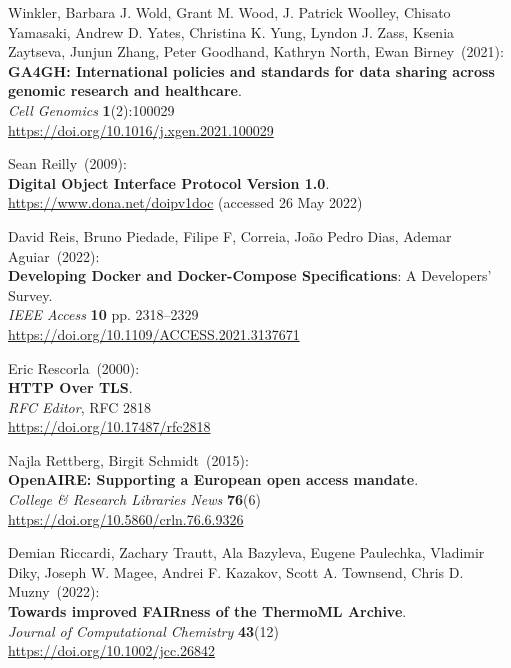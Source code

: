 \begin{thebibliography}{9}
Winkler, Barbara J. Wold, Grant M. Wood, J. Patrick Woolley, Chisato Yamasaki, Andrew D. Yates, Christina K. Yung, Lyndon J. Zass, Ksenia Zaytseva, Junjun Zhang, Peter Goodhand, Kathryn North, Ewan Birney~(2021): \\
\textbf{GA4GH: International policies and standards for data sharing across genomic research and healthcare}.\\
\emph{Cell Genomics} \textbf{1}(2):100029\\
\url{https://doi.org/10.1016/j.xgen.2021.100029}

Sean Reilly~(2009): \\
\textbf{Digital Object Interface Protocol Version 1.0}.\\
\url{https://www.dona.net/doipv1doc} (accessed 26 May 2022)

David Reis, Bruno Piedade, Filipe F, Correia, João Pedro Dias, Ademar Aguiar~(2022): \\
\textbf{Developing Docker and Docker-Compose Specifications}: A Developers’ Survey.\\
\emph{IEEE Access} \textbf{10} pp. 2318--2329 \\
\url{https://doi.org/10.1109/ACCESS.2021.3137671}

Eric Rescorla~(2000): \\
\textbf{HTTP Over TLS}.\\
\emph{RFC Editor}, RFC 2818\\
\url{https://doi.org/10.17487/rfc2818}

Najla Rettberg, Birgit Schmidt~(2015): \\
\textbf{OpenAIRE: Supporting a European open access mandate}.\\
\emph{College \& Research Libraries News} \textbf{76}(6) \\
\url{https://doi.org/10.5860/crln.76.6.9326}

Demian Riccardi, Zachary Trautt, Ala Bazyleva, Eugene Paulechka, Vladimir Diky, Joseph W. Magee, Andrei F. Kazakov, Scott A. Townsend, Chris D. Muzny~(2022): \\
\textbf{Towards improved {FAIRness} of the {ThermoML} Archive}.\\
\emph{Journal of Computational Chemistry} \textbf{43}(12)\\
\url{https://doi.org/10.1002/jcc.26842}


\end{thebibliography}
